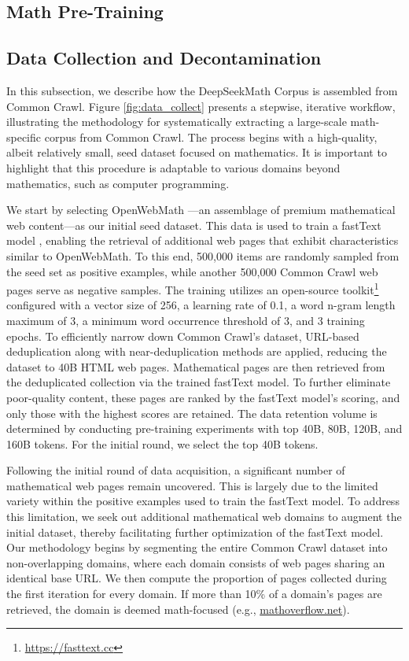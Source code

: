\begin{itemize}[topsep=0pt]
\section{Math Pre-Training}

\subsection{Data Collection and Decontamination} In this subsection, we describe how the DeepSeekMath Corpus is assembled from Common Crawl. Figure \ref{fig:data_collect} presents a stepwise, iterative workflow, illustrating the methodology for systematically extracting a large-scale math-specific corpus from Common Crawl. The process begins with a high-quality, albeit relatively small, seed dataset focused on mathematics. It is important to highlight that this procedure is adaptable to various domains beyond mathematics, such as computer programming.

We start by selecting OpenWebMath \citep{openwebmath}—an assemblage of premium mathematical web content—as our initial seed dataset. This data is used to train a fastText model \citep{joulin2016fasttext}, enabling the retrieval of additional web pages that exhibit characteristics similar to OpenWebMath. To this end, 500,000 items are randomly sampled from the seed set as positive examples, while another 500,000 Common Crawl web pages serve as negative samples. The training utilizes an open-source toolkit\footnote{\url{https://fasttext.cc}} configured with a vector size of 256, a learning rate of 0.1, a word n-gram length maximum of 3, a minimum word occurrence threshold of 3, and 3 training epochs. To efficiently narrow down Common Crawl’s dataset, URL-based deduplication along with near-deduplication methods are applied, reducing the dataset to 40B HTML web pages. Mathematical pages are then retrieved from the deduplicated collection via the trained fastText model. To further eliminate poor-quality content, these pages are ranked by the fastText model’s scoring, and only those with the highest scores are retained. The data retention volume is determined by conducting pre-training experiments with top 40B, 80B, 120B, and 160B tokens. For the initial round, we select the top 40B tokens.

Following the initial round of data acquisition, a significant number of mathematical web pages remain uncovered. This is largely due to the limited variety within the positive examples used to train the fastText model. To address this limitation, we seek out additional mathematical web domains to augment the initial dataset, thereby facilitating further optimization of the fastText model. Our methodology begins by segmenting the entire Common Crawl dataset into non-overlapping domains, where each domain consists of web pages sharing an identical base URL. We then compute the proportion of pages collected during the first iteration for every domain. If more than 10\% of a domain’s pages are retrieved, the domain is deemed math-focused (e.g., \url{mathoverflow.net}).


\end{itemize}
